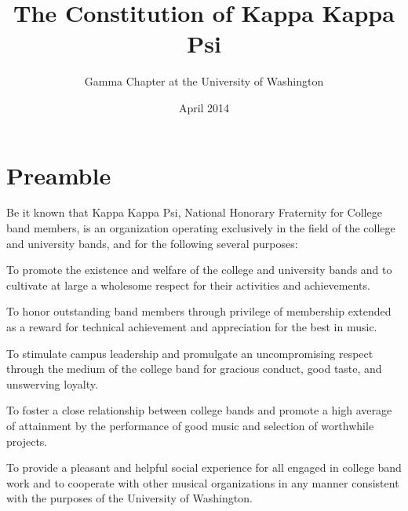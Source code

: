 \documentclass[11pt]{article}
\begin{document}
\title{The Constitution of Kappa Kappa Psi}
\author{Gamma Chapter at the University of Washington}
\date{April 2014}
\maketitle

\section*{Preamble}
Be it known that Kappa Kappa Psi, National Honorary Fraternity for College band members, is an organization operating exclusively in the field of the college and university bands, and for the following several purposes:

\begin{ol}
  \item To promote the existence and welfare of the college and university bands and to cultivate at large a wholesome respect for their activities and achievements.
  \item To honor outstanding band members through privilege of membership extended as a reward for technical achievement and appreciation for the best in music.
  \item To stimulate campus leadership and promulgate an uncompromising respect through the medium of the college band for gracious conduct, good taste, and unswerving loyalty.
  \item To foster a close relationship between college bands and promote a high average of attainment by the performance of good music and selection of worthwhile projects.
  \item To provide a pleasant and helpful social experience for all engaged in college band work and to cooperate with other musical organizations in any manner consistent with the purposes of the University of Washington.
\end{ol}
\end{document}
